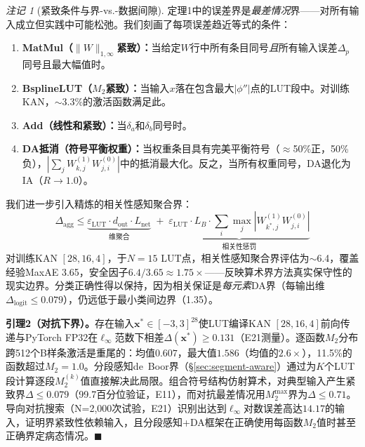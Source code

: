 \documentclass[journal,onecolumn]{IEEEtran}
\theoremstyle{definition}
\theoremstyle{plain}
\theoremstyle{remark}
\newtheorem{remark}{注记}
\begin{document}
\begin{remark}[紧致条件与界-vs.-数据间隙]
\label{rem:tightness}
定理1中的误差界是\textit{最差情况}界——对所有输入成立但实践中可能松弛。我们刻画了每项误差趋近等式的条件：
\begin{enumerate}
    \item \textbf{MatMul（$\|W\|_{1,\infty}$紧致）：}当给定$W$行中所有条目同号\textit{且}所有输入误差$\Delta_p$同号且最大幅值时。
    \item \textbf{BsplineLUT（$M_2$紧致）：}当输入$x$落在包含最大$|\phi''|$点的LUT段中。对训练KAN，$\sim$3.3\%的激活函数满足此。
    \item \textbf{Add（线性和紧致）：}当$\delta_a$和$\delta_b$同号时。
    \item \textbf{DA抵消（符号平衡权重）：}当权重条目具有完美平衡符号（$\approx$50\%正，50\%负），$|\sum_j W^{(1)}_{k,j} W^{(0)}_{j,i}|$中的抵消最大化。反之，当所有权重同号，DA退化为IA（$R \to 1.0$）。
\end{enumerate}

我们进一步引入精炼的相关性感知聚合界：
\begin{equation}
\Delta_{\text{agg}} \leq \underbrace{\varepsilon_{\text{LUT}} \cdot d_{\text{out}} \cdot L_{\text{net}}}_{\text{维聚合}} \;+\; \underbrace{\varepsilon_{\text{LUT}} \cdot L_B \cdot \sum_i \max_j |W^{(1)}_{k^*,j} W^{(0)}_{j,i}|}_{\text{相关性惩罚}}
\label{eq:correlation_aware}
\end{equation}
对训练KAN $[28,16,4]$，于$N=15$ LUT点，相关性感知聚合界评估为$\sim$6.4，覆盖经验MaxAE 3.65，安全因子$6.4/3.65 \approx 1.75\times$——反映算术界方法真实保守性的现实边界。分类正确性得以保持，因为相关保证是\textit{每元素}DA界（每输出维$\Delta_{\text{logit}} \leq 0.079$），仍远低于最小类间边界（1.35）。
\end{remark}

\vspace{4pt}
\noindent\textbf{引理2（对抗下界）。}存在输入$\mathbf{x}^* \in [-3,3]^{28}$使LUT编译KAN $[28,16,4]$前向传递与PyTorch FP32在$\ell_\infty$范数下相差$\Delta(\mathbf{x}^*) \geq 0.131$（E21测量）。逐函数$M_2$分布跨512个B样条激活是重尾的：均值$0.607$，最大值$1.586$（均值的$2.6\times$），11.5\%的函数超过$M_2 = 1.0$。分段感知de~Boor界（\S\ref{sec:segment-aware}）通过为$K$个LUT段计算逐段$M_2^{(k)}$值直接解决此局限。组合符号结构仿射算术，对典型输入产生紧致界$\Delta \leq 0.079$（99.7百分位验证，E11），而对抗最差情况用$M_2^{\max}$界为$\Delta \leq 0.71$。导向对抗搜索（N=2,000次试验，E21）识别出达到$\ell_\infty$对数误差高达$14.17$的输入，证明界紧致性依赖输入，且分段感知+DA框架在正确使用每函数$M_2$值时甚至正确界定病态情况。\hfill $\blacksquare$
\end{document}

